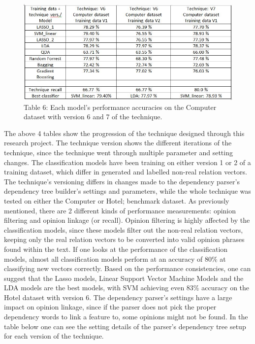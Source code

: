 \documentclass{sig-alternate}
\begin{document}
\begin{figure}
\centering
\includegraphics[scale=0.55]{images/res4.JPG}
Table 6: Each model's performance accuracies on the Computer dataset with version 6 and 7 of the technique.
\end{figure}

The above 4 tables show the progression of the technique designed through this research project. The technique version shows the different iterations of the technique, since the technique went through multiple parameter and setting changes.  The classification models have been training on either version 1 or 2 of a training dataset, which differ in generated and labelled non-real relation vectors. The technique's versioning differs in changes made to the dependency parser's dependency tree builder's settings and parameters, while the whole technique was tested on either the Computer\cite{HuLiu2004} or Hotel\cite{WangLuZhai2010};\cite{WangLuZhai2011} benchmark dataset.
As previously mentioned, there are 2 different kinds of performance measurements: opinion filtering and opinion linkage (or recall). Opinion filtering is highly affected by the classification models, since these models filter out the non-real relation vectors, keeping only the real relation vectors to be converted into valid opinion phrases found within the text. If one looks at the performance of the classification models, almost all classification models perform at an accuracy of 80\% at classifying new vectors correctly. Based on the performance consistencies, one can suggest that the Lasso models, Linear Support Vector Machine Models and the LDA models are the best models, with SVM achieving even 83\% accuracy on the Hotel dataset with version 6.
The dependency parser's settings have a large impact on opinion linkage, since if the parser does not pick the proper dependency words to link a feature to, some opinions might not be found. In the table below one can see the setting details of the parser's dependency tree setup for each version of the technique.
\end{document}
